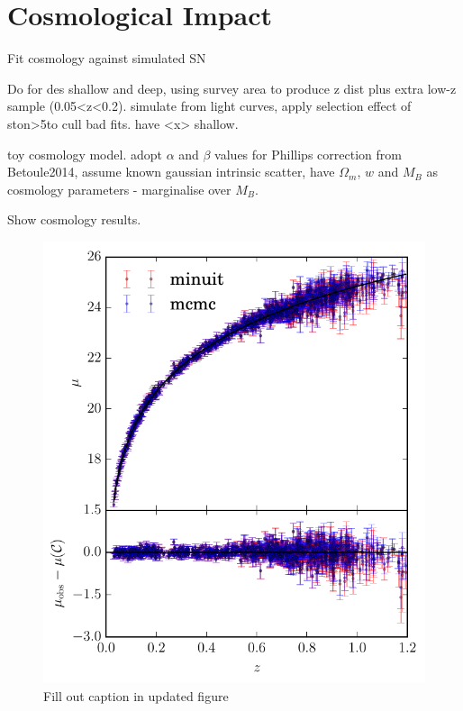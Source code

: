 \documentclass[a4paper,fleqn,usenatbib]{mnras}
\newcommand{\red}{\color{red}}
\begin{document}
\section{Cosmological Impact}
\label{sec:cosmology}
Fit cosmology against simulated SN

Do for des shallow and deep, using survey area to produce z dist plus extra low-z sample (0.05<z<0.2). simulate from light curves, apply selection effect of ston>5to cull bad fits. have <x> shallow.

toy cosmology model. adopt $\alpha$ and $\beta$ values for Phillips correction from Betoule2014, assume known gaussian intrinsic scatter, have $\Omega_m$, $w$ and $M_B$ as cosmology parameters - marginalise over $M_B$.

Show cosmology results.

\begin{figure}
	\includegraphics[width=\columnwidth]{../output/obs_cosmology_shallow.pdf}
	\caption{{\red Fill out caption in updated figure}}
	\label{fig:obs_cosmology_shallow}
\end{figure}
\end{document}
